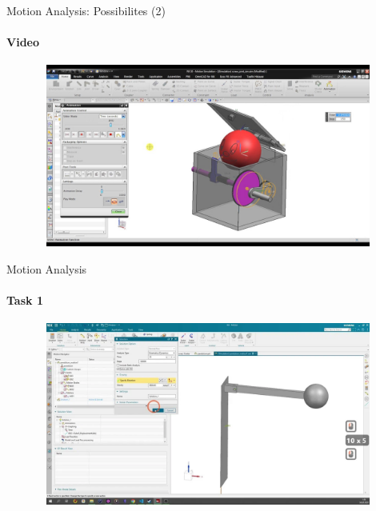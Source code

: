\documentclass[aspectratio=169]{beamer}
\begin{document}
\begin{frame}[t]{Motion Analysis: Possibilites (2)}
    \framesubtitle{Video}
    \vspace{-0.6cm}
    \begin{figure}[H]
        \href{https://youtu.be/p_bHL19dTRY}{
            \centering\includegraphics[height=6cm,width=1\textwidth,keepaspectratio]{motion_video2_preview.jpg}}
        \label{fig:motion_video2_preview.jpg}
    \end{figure}
\end{frame}

\begin{frame}[t]{Motion Analysis}
    \framesubtitle{Task 1}
    \vspace{-0.6cm}
    \begin{figure}[H]
        \href{https://disk.yandex.ru/i/RsjuS-pJY70Oww}{
            \centering\includegraphics[height=6cm,width=1\textwidth,keepaspectratio]{motion_video_preview.png}}
        \label{fig:motion_video_preview.png}
    \end{figure}
\end{frame}
\end{document}
